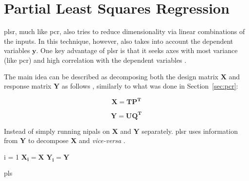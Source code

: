 \section{Partial Least Squares Regression}
\label{sec:plsr}

\acrshort{plsr}, much like \acrshort{pcr}, also tries to reduce dimensionality via linear combinations of the inputs. In this technique, however, also takes into account the dependent variables $\mathbf{y}$. One key advantage of \acrshort{plsr} is that it seeks axes with most variance (like \acrshort{pcr}) and high correlation with the dependent variables \parencite{friedman2001}.

The main idea can be described as decomposing both the design matrix $\mathbf{X}$ and response matrix $\mathbf{Y}$ as follows \parencite{ng2013}, similarly to what was done in Section~\ref{sec:pcr}:

\begin{equation}
	\label{eqn:x-decomp}
	\mathbf{X=TP^T}
\end{equation}

\begin{equation}
	\label{eqn:y-decomp}
	\mathbf{Y = UQ^T}
\end{equation}

Instead of simply running \acrshort{nipals} on $\mathbf{X}$ and $\mathbf{Y}$ separately. \acrshort{plsr} uses information from $\mathbf{Y}$ to decompose $\mathbf{X}$ and \textit{vice-versa} \parencite{ng2013}.

\begin{algorithm}[H]
	\label{algo:pls}
	\SetAlgoLined
	i = 1\;
	$\mathbf{X_i = X}$\;
	$\mathbf{Y_i = Y}$\;
	
\caption{\acrfull{pls}}
\end{algorithm}

